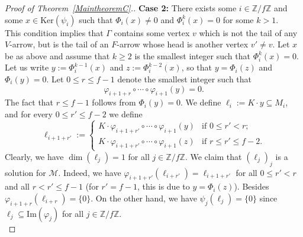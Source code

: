 \documentclass[12pt]{amsart}
\theoremstyle{definition}
\newcommand{\<}{\langle}   %
\renewcommand{\>}{\rangle} %
\begin{document}
\begin{proof}[Proof of Theorem~\ref{MaintheoremC}.]
    \textbf{Case 2:} There exists some $i \in \mathbb Z/f\mathbb Z$ and some $x \in \mathrm{Ker}(\psi_i)$ such that $\Phi_i(x) \not = 0$ and $\Phi_i^k(x) = 0$ for some $k>1$. \\
    This condition implies that $\Gamma$ contains some vertex $v$ which is not the tail of any $V$-arrow, but is the tail of an $F$-arrow whose head is another vertex $v' \not = v$. Let $x$ be as above and assume that $k \geq 2$ is the smallest integer such that $\Phi_i^k(x) = 0$. Let us write $y := \Phi^{k-1}_i(x)$ and $z := \Phi_i^{k-2}(x)$, so that $y = \Phi_i(z)$ and $\Phi_i(y) = 0$. Let $0 \leq r \leq f-1$ denote the smallest integer such that 
    \begin{equation*}
        \varphi_{i+1+r} \circ \cdots \circ \varphi_{i+1}(y) = 0.
    \end{equation*}
    The fact that $r \leq f-1$ follows from $\Phi_i(y) = 0$. We define $\ell_i := K \cdot y \subseteq M_i$, and for every $0 \leq r' \leq f-2$ we define 
    \begin{equation*}
        \ell_{i+1+r'} := \begin{cases}
            K \cdot \varphi_{i+1+r'} \circ \cdots \circ \varphi_{i+1}(y) & \text{if } 0 \leq r' < r;\\
            K \cdot \varphi_{i+1+r'} \circ \cdots \circ \varphi_{i+1}(z) & \text{if } r \leq r' \leq f-2.
        \end{cases}
    \end{equation*}
    Clearly, we have $\dim(\ell_j) = 1$ for all $j \in \mathbb Z/f\mathbb Z$. We claim that $(\ell_j)_j$ is a solution for $\mathcal M$. Indeed, we have $\varphi_{i+1+r'}(\ell_{i+r'}) = \ell_{i+1+r'}$ for all $0 \leq r' < r$ and all $r < r' \leq f-1$ (for $r' = f-1$, this is due to $y = \Phi_i(z)$). Besides $\varphi_{i+1+r}(\ell_{i+r}) = \{0\}$. On the other hand, we have $\psi_j(\ell_j) = \{0\}$ since $\ell_j \subseteq \mathrm{Im}(\varphi_j)$ for all $j \in \mathbb Z/f\mathbb Z$.\\


\end{proof}
\end{document}
